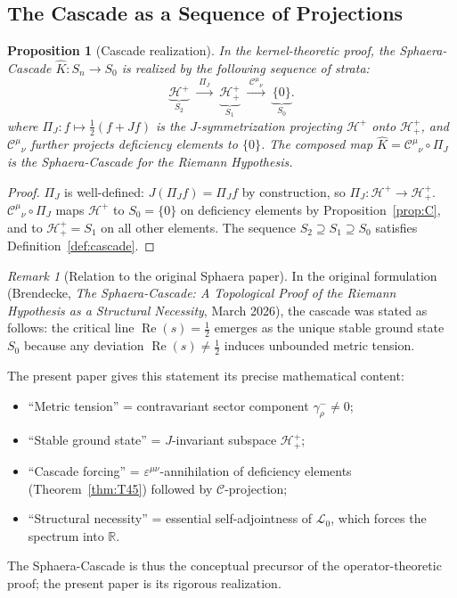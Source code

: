 \documentclass[12pt,a4paper]{article}
\newtheorem{proposition}[theorem]{Proposition}
\theoremstyle{remark}
\newtheorem*{remark}{Remark}
\begin{document}
\subsection*{The Cascade as a Sequence of Projections}

\begin{proposition}[Cascade realization]\label{prop:cascade}
In the kernel-theoretic proof, the Sphaera-Cascade
$\hat{K}:S_n\to S_0$ is realized by the following sequence of strata:
\[
\underbrace{\mathcal{H}^+}_{S_2}
\;\xrightarrow{\;\Pi_J\;}\;
\underbrace{\mathcal{H}^+_+}_{S_1}
\;\xrightarrow{\;\mathcal{C}^{\mu}{}_\nu\;}\;
\underbrace{\{0\}}_{S_0}.
\]
where $\Pi_J:f\mapsto\tfrac{1}{2}(f+Jf)$ is the $J$-symmetrization
projecting $\mathcal{H}^+$ onto $\mathcal{H}^+_+$,
and $\mathcal{C}^{\mu}{}_\nu$ further projects deficiency elements to $\{0\}$.
The composed map $\hat{K}=\mathcal{C}^{\mu}{}_\nu\circ\Pi_J$ is the
Sphaera-Cascade for the Riemann Hypothesis.
\end{proposition}
\begin{proof}
$\Pi_J$ is well-defined: $J(\Pi_J f)=\Pi_J f$ by construction,
so $\Pi_J:\mathcal{H}^+\to\mathcal{H}^+_+$.
$\mathcal{C}^{\mu}{}_\nu\circ\Pi_J$ maps $\mathcal{H}^+$ to $S_0=\{0\}$
on deficiency elements by Proposition~\ref{prop:C}, and to
$\mathcal{H}^+_+=S_1$ on all other elements.
The sequence $S_2\supseteq S_1\supseteq S_0$ satisfies
Definition~\ref{def:cascade}.
\end{proof}

\begin{remark}[Relation to the original Sphaera paper]
In the original formulation (Brendecke, \textit{The Sphaera-Cascade:
A Topological Proof of the Riemann Hypothesis as a Structural Necessity},
March 2026), the cascade was stated as follows:
the critical line $\operatorname{Re}(s)=\tfrac{1}{2}$ emerges as
the unique stable ground state $S_0$ because any deviation
$\operatorname{Re}(s)\neq\tfrac{1}{2}$ induces unbounded metric tension.

The present paper gives this statement its precise mathematical content:
\begin{itemize}
\item ``Metric tension'' = contravariant sector component $\gamma_\rho^-\neq0$;
\item ``Stable ground state'' = $J$-invariant subspace $\mathcal{H}^+_+$;
\item ``Cascade forcing'' = $\varepsilon^{\mu\nu}$-annihilation of deficiency
      elements (Theorem~\ref{thm:T45}) followed by $\mathcal{C}$-projection;
\item ``Structural necessity'' = essential self-adjointness of $\mathcal{L}_0$,
      which forces the spectrum into $\mathbb{R}$.
\end{itemize}
The Sphaera-Cascade is thus the conceptual precursor of the
operator-theoretic proof; the present paper is its rigorous realization.
\end{remark}
\end{document}
